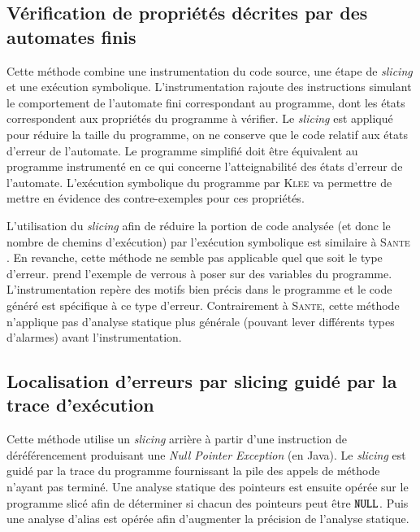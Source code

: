 \documentclass[french]{spimufcphdthesis}
\begin{document}
\subsection{Vérification de propriétés décrites par des automates finis}

Cette méthode \cite{checking-prop-state-machines} combine une instrumentation du
code source, une étape de {\em slicing} et une exécution symbolique.
L'instrumentation rajoute des instructions simulant le comportement de
l'automate fini correspondant au programme, dont les états correspondent aux
propriétés du programme à vérifier.
Le {\em slicing} est appliqué pour réduire la taille du programme, on ne
conserve que le code relatif aux états d'erreur de l'automate. Le programme
simplifié doit être équivalent au programme instrumenté en ce qui concerne
l'atteignabilité des états d'erreur de l'automate.
L'exécution symbolique du programme par \textsc{Klee} \cite{KLEE} va permettre
de mettre en évidence des contre-exemples pour ces propriétés.

L'utilisation du {\em slicing} afin de réduire la portion de code analysée
(et donc le nombre de chemins d'exécution) par l'exécution symbolique est
similaire à \textsc{Sante} \cite{SANTE}. En revanche, cette méthode ne semble
pas applicable quel que soit le type d'erreur.
\cite{checking-prop-state-machines} prend l'exemple de verrous à poser sur des
variables du programme. L'instrumentation repère des motifs bien précis dans le
programme et le code généré est spécifique à ce type d'erreur. Contrairement à
\textsc{Sante}, cette méthode n'applique pas d'analyse statique plus générale
(pouvant lever différents types d'alarmes) avant l'instrumentation.

\subsection{Localisation d'erreurs par slicing guidé par la trace d'exécution}

Cette méthode \cite{fault-localization} utilise un {\em slicing} arrière à
partir d'une instruction de déréférencement produisant une {\em Null Pointer
Exception} (en Java). Le {\em slicing} est guidé par la trace du programme
fournissant la pile des appels de méthode n'ayant pas terminé. Une analyse
statique des pointeurs est ensuite opérée sur le programme slicé afin de
déterminer si chacun des pointeurs peut être ${\tt NULL}$. Puis une analyse
d'alias est opérée afin d'augmenter la précision de l'analyse statique.
\end{document}
